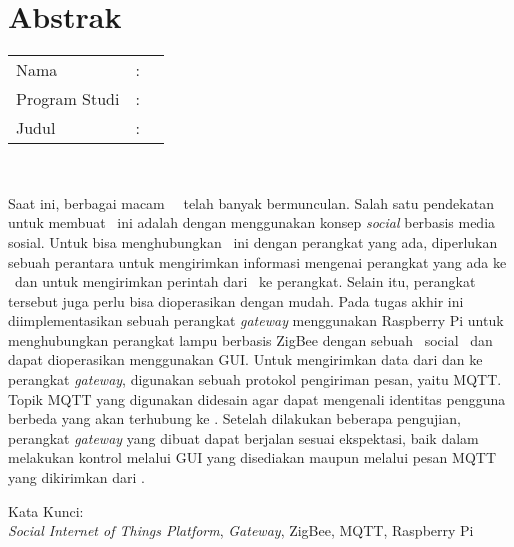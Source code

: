 %
%
%

\chapter*{Abstrak}

\vspace*{0.2cm}

\noindent \begin{tabular}{l l p{10cm}}
	Nama&: & \penulis \\
	Program Studi&: & \program \\
	Judul&: & \judul \\
\end{tabular} \\ 

\vspace*{0.5cm}

\noindent 
Saat ini, berbagai macam \plat~\iot~telah banyak bermunculan. Salah satu pendekatan untuk membuat \plat~ini adalah dengan menggunakan konsep \textit{social \iot} berbasis media sosial. Untuk bisa menghubungkan \plat~ini dengan perangkat yang ada, diperlukan sebuah perantara untuk mengirimkan informasi mengenai perangkat yang ada ke \plat~dan untuk mengirimkan perintah dari \plat~ke perangkat. Selain itu, perangkat tersebut juga perlu bisa dioperasikan dengan mudah. Pada tugas akhir ini diimplementasikan sebuah perangkat \textit{gateway} menggunakan Raspberry Pi untuk menghubungkan perangkat lampu berbasis ZigBee dengan sebuah \plat~social \iot~dan dapat dioperasikan menggunakan GUI. Untuk mengirimkan data dari dan ke perangkat \textit{gateway}, digunakan sebuah protokol pengiriman pesan, yaitu MQTT. Topik MQTT yang digunakan didesain agar dapat mengenali identitas pengguna berbeda yang akan terhubung ke \plat. Setelah dilakukan beberapa pengujian, perangkat \textit{gateway} yang dibuat dapat berjalan sesuai ekspektasi, baik dalam melakukan kontrol melalui GUI yang disediakan maupun melalui pesan MQTT yang dikirimkan dari \plat.\\

\vspace*{0.2cm}

\noindent Kata Kunci: \\ 
\noindent \textit{Social Internet of Things Platform}, \textit{Gateway}, ZigBee, MQTT, Raspberry Pi\\

\newpage